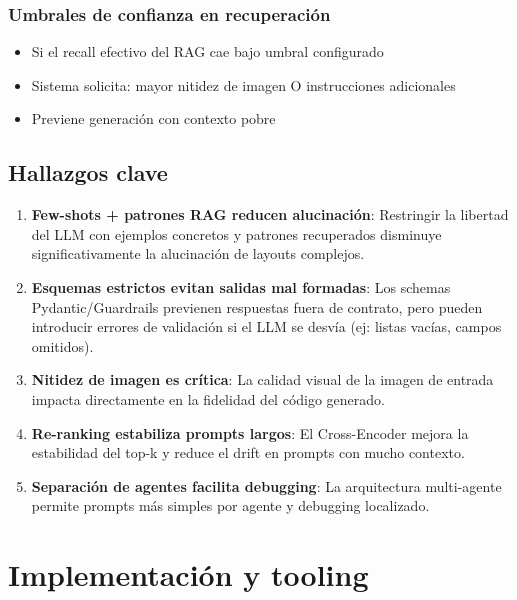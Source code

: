 \documentclass[12pt,a4paper]{article}
\begin{document}
\subsubsection{Umbrales de confianza en recuperación}

\begin{itemize}
    \item Si el recall efectivo del RAG cae bajo umbral configurado
    \item Sistema solicita: mayor nitidez de imagen O instrucciones adicionales
    \item Previene generación con contexto pobre
\end{itemize}

\subsection{Hallazgos clave}

\begin{enumerate}
    \item \textbf{Few-shots + patrones RAG reducen alucinación}: Restringir la libertad del LLM con ejemplos concretos y patrones recuperados disminuye significativamente la alucinación de layouts complejos.
    
    \item \textbf{Esquemas estrictos evitan salidas mal formadas}: Los schemas Pydantic/Guardrails previenen respuestas fuera de contrato, pero pueden introducir errores de validación si el LLM se desvía (ej: listas vacías, campos omitidos).
    
    \item \textbf{Nitidez de imagen es crítica}: La calidad visual de la imagen de entrada impacta directamente en la fidelidad del código generado.
    
    \item \textbf{Re-ranking estabiliza prompts largos}: El Cross-Encoder mejora la estabilidad del top-k y reduce el drift en prompts con mucho contexto.
    
    \item \textbf{Separación de agentes facilita debugging}: La arquitectura multi-agente permite prompts más simples por agente y debugging localizado.
\end{enumerate}

\section{Implementación y tooling}
\end{document}
